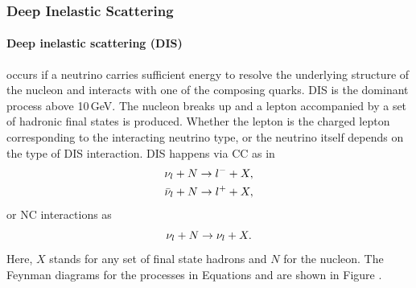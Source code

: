 \subsubsection{Deep Inelastic Scattering}

\paragraph{Deep inelastic scattering (DIS)} occurs if a neutrino carries sufficient energy to resolve the underlying structure of the nucleon and interacts with one of the composing quarks.
DIS is the dominant process above 10\,GeV. The nucleon breaks up and a lepton accompanied by a set of hadronic final states is produced.
Whether the lepton is the charged lepton corresponding to the interacting neutrino type, or the neutrino itself depends on the type of DIS interaction.
DIS happens via CC as in 
\begin{equation}
    \begin{split}
        \nu_l + N \rightarrow l^- + X, \\
        \bar{\nu}_l + N \rightarrow l^+ + X, \\
    \end{split}
    \labeq{dis_cc}
\end{equation}
or NC interactions as
\begin{equation}
    \nu_l + N \rightarrow \nu_l + X.
        \labeq{dis_nc}
\end{equation}
Here, $X$ stands for any set of final state hadrons and $N$ for the nucleon.
The Feynman diagrams for the processes in Equations  and  are shown in Figure .

